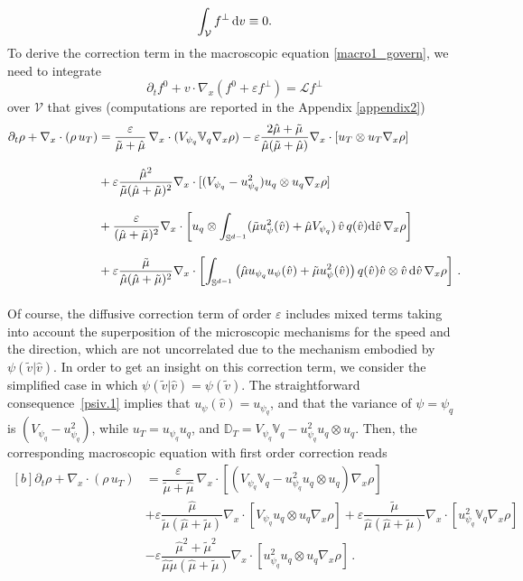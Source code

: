 \documentclass[a4paper]{article}
\theoremstyle{Theorem}\newtheorem{proposition}{Proposition}[section]
\theoremstyle{Remark}\newtheorem{remark}{Remark}[section]
\theoremstyle{Theorem}\newtheorem{theorem}{Theorem}[section]
\newcommand{\hv}{\hat{v}}
\newcommand{\tv}{\tilde{v}}
\newcommand{\hmu}{\hat{\mu}}
\newcommand{\tmu}{\tilde{\mu}}
\newcommand{\intS}{\int_{\mathbb{S}^{d-1}}}
\newcommand{\intV}{\int_{\mathcal{V}}}
\begin{document}
$$
\intV f^{\bot} \, {\rm d} v  \equiv 0.
$$
To derive the correction term in the macroscopic equation \eqref{macro1_govern}, we need to integrate
\[
\partial_t f^0 +v\cdot \nabla_x (f^0+\varepsilon f^{\bot}) =\mathcal{L}f^{\bot}
\]
over $\mathcal{V}$ that gives (computations are reported in the Appendix \ref{appendix2})
\begin{equation}\label{macro1_govern_corr}
\begin{split}
    \partial_t \rho + \nabla_x \cdot (\rho \, u_T)& =  \dfrac{\varepsilon}{\tmu+\hmu} \, \nabla_x \cdot(V_{\psi_q}\mathbb{V}_q \nabla_x\rho)-\varepsilon\dfrac{2\hmu+\tmu}{\hmu(\tmu+\hmu)}\nabla_x\cdot[u_T\otimes u_T\nabla_x\rho] \\[0.3cm]
    &+\varepsilon\dfrac{\hmu^2}{\tmu(\hmu+\tmu)^2}\nabla_x\cdot[(V_{\psi_q}-u_{\psi_q}^2) u_q\otimes u_q\nabla_x\rho]\\[0.3cm]
    &+\dfrac{\varepsilon}{(\hmu+\tmu)^2}\nabla_x\cdot\left[u_q\otimes\intS (\tmu u_\psi^2(\hv)+\hmu V_{\psi_q})\,\hv\, q(\hv){\rm d}\hv\,\nabla_x\rho\right]\\[0.3cm]
        &+\varepsilon\dfrac{\tmu}{\hmu(\hmu+\tmu)^2}\nabla_x\cdot\left[\intS \left(\hmu u_{\psi_q} u_\psi(\hv)+\tmu u_\psi^2(\hv)\right) q(\hv)\hv\otimes\hv\,{\rm d}\hv\,\nabla_x\rho\right]\,.\\[0.3cm]
    \end{split}
\end{equation}
Of course, the diffusive correction term of order $\varepsilon$ includes mixed terms taking into account the superposition of the microscopic mechanisms for the speed and the direction, which are not uncorrelated due to the mechanism embodied by $\psi(\tv|\hv)$.
In order to get an insight on this correction term, we consider the simplified case in which $\psi(\tv|\hv)=\psi(\tv)$. The straightforward consequence~\eqref{psiv.1} implies that ${u_\psi(\hv)=u_{\psi_q}}$, and that the variance of $\psi=\psi_q$ is $(V_{\psi_q} -u_{\psi_q}^2)$, while $u_T=u_{\psi_q}u_q$, and $\mathbb{D}_T=V_{\psi_q}\mathbb{V}_q-u_{\psi_q}^2u_q\otimes u_q$. Then, the corresponding macroscopic equation with first order correction reads
\begin{equation}\label{macro1_corr_simpl}
\begin{aligned}[b]
    \partial_t \rho + \nabla_x \cdot (\rho \, u_T)& =  \dfrac{\varepsilon}{\tmu+\hmu} \, \nabla_x \cdot\left[\left(V_{\psi_q}\mathbb{V}_q-u_{\psi_q}^2u_q\otimes u_q\right) \nabla_x\rho\right]\\[0.3cm]
    &+\varepsilon\dfrac{\hmu}{\tmu(\hmu+\tmu)}\nabla_x\cdot\left[V_{\psi_q} u_q\otimes u_q\nabla_x\rho\right]+\varepsilon\dfrac{\tmu}{\hmu(\hmu+\tmu)}\nabla_x\cdot[u_{\psi_q}^2 \mathbb{V}_q\nabla_x\rho]\\[0.3cm]
    &-\varepsilon\dfrac{\hmu^2+\tmu^2}{\hmu\tmu(\hmu+\tmu)}\nabla_x\cdot\left[u_{\psi_q}^2u_q\otimes u_q\nabla_x\rho\right]\,.
    \end{aligned}
\end{equation} 
\end{document}
